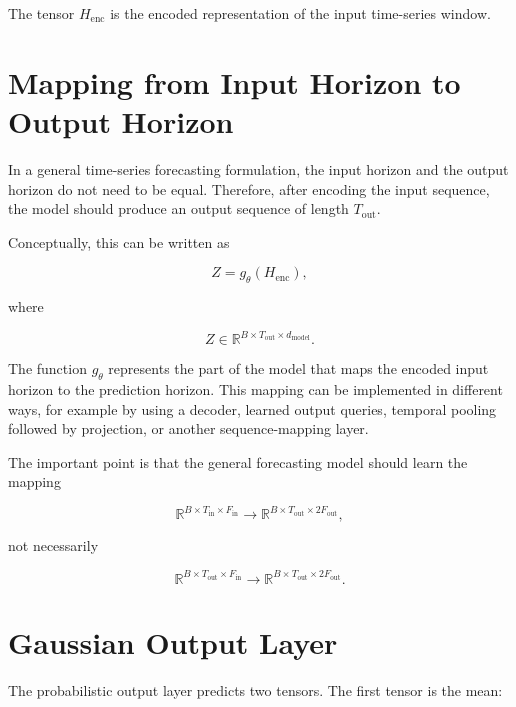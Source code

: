 \documentclass[a4paper]{article}
\begin{document}
        The tensor \(H_{\mathrm{enc}}\) is the encoded representation of the input time-series window.
    
    
    \section{Mapping from Input Horizon to Output Horizon}
        
        In a general time-series forecasting formulation, the input horizon and the output horizon do not need to be equal. Therefore, after encoding the input sequence, the model should produce an output sequence of length \(T_{\mathrm{out}}\).
        
        Conceptually, this can be written as
        
        \[
            Z
            =
            g_{\theta}
            \left(
                H_{\mathrm{enc}}
            \right),
        \]
        
        where
        
        \[
            Z
            \in
            \mathbb{R}^{B \times T_{\mathrm{out}} \times d_{\mathrm{model}}}.
        \]
        
        The function \(g_{\theta}\) represents the part of the model that maps the encoded input horizon to the prediction horizon. This mapping can be implemented in different ways, for example by using a decoder, learned output queries, temporal pooling followed by projection, or another sequence-mapping layer.
        
        The important point is that the general forecasting model should learn the mapping
        
        \[
            \mathbb{R}^{B \times T_{\mathrm{in}} \times F_{\mathrm{in}}}
            \rightarrow
            \mathbb{R}^{B \times T_{\mathrm{out}} \times 2F_{\mathrm{out}}},
        \]
        
        not necessarily
        
        \[
            \mathbb{R}^{B \times T_{\mathrm{out}} \times F_{\mathrm{in}}}
            \rightarrow
            \mathbb{R}^{B \times T_{\mathrm{out}} \times 2F_{\mathrm{out}}}.
        \]
    
    
    \section{Gaussian Output Layer}
        
        The probabilistic output layer predicts two tensors. The first tensor is the mean:
        
\end{document}
